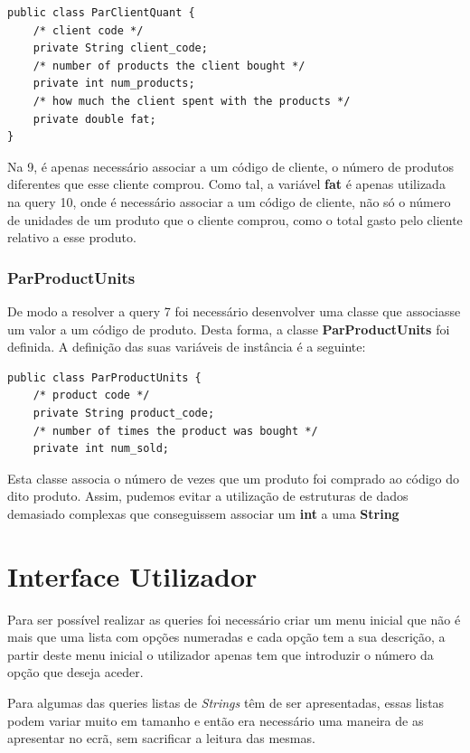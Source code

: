 \documentclass[10pt] {article}
\begin{document}
\begin{lstlisting}
public class ParClientQuant {
    /* client code */
	private String client_code;
	/* number of products the client bought */
    private int num_products;
    /* how much the client spent with the products */
    private double fat;
}
\end{lstlisting}


Na  9, é apenas necessário associar a um código de cliente, o número de produtos diferentes que esse cliente comprou.
Como tal, a variável \textbf{fat} é apenas utilizada na query 10, onde é necessário associar a um código de cliente, não só o número de unidades de um produto que o cliente comprou, como o total gasto pelo cliente relativo a esse produto.

\subsubsection{ParProductUnits}

De modo a resolver a query 7 foi necessário desenvolver uma classe que associasse um valor a um código de produto.
Desta forma, a classe \color{blue} \textbf{ParProductUnits} \color{black} foi definida. A definição das suas variáveis de instância
é a seguinte:

\begin{lstlisting}
public class ParProductUnits {
	/* product code */
    private String product_code;
    /* number of times the product was bought */
    private int num_sold;
\end{lstlisting}


Esta classe associa o número de vezes que um produto foi comprado ao código do dito produto.
Assim, pudemos evitar a utilização de estruturas de dados demasiado complexas que conseguissem associar um \textbf{int} a uma \color{blue} \textbf{String} \color{black}

\newpage

\newpage
\section{Interface Utilizador}

Para ser possível realizar as queries foi necessário criar um menu inicial que não é mais que uma lista com opções numeradas e cada opção tem a sua descrição, a partir deste menu inicial o utilizador apenas tem que introduzir o número da opção que deseja aceder.

Para algumas das queries listas de \emph{Strings} têm de ser apresentadas, essas listas podem variar muito  em tamanho e então era necessário uma maneira de as apresentar no ecrã, sem sacrificar a leitura das mesmas.
\end{document}
